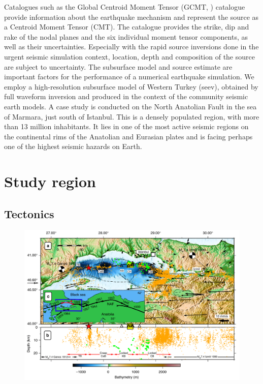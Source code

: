 \documentclass[../Text/00main.tex]{subfiles}
\begin{document}
Catalogues such as the Global Centroid Moment Tensor (GCMT, \cite{ekstromdziewo}) catalogue provide information about the earthquake mechanism and represent the source as a Centroid Moment Tensor (CMT). The catalogue provides the strike, dip and rake of the nodal planes and the six individual moment tensor components, as well as their uncertainties.  Especially with the rapid source inversions done in the urgent seismic simulation context, location, depth and composition of the source are subject to uncertainty. The subsurface model and source estimate are important factors for the performance of a numerical earthquake simulation. We employ a high-resolution subsurface model of Western Turkey (seev\cite{cubuk-sabuncu_3-d_2017}), obtained by full waveform inversion and produced in the context of the community seismic earth models. A case study is conducted on the North Anatolian Fault in the sea of Marmara, just south of Istanbul. This is a densely populated region, with more than 13 million inhabitants. It lies in one of the most active seismic regions on the continental rims of the Anatolian and Eurasian plates and is facing perhaps one of the highest seismic hazards on Earth.


\section{Study region} \label{CH1sec:Tectonics}

\subsection{Tectonics}
 \begin{figure}
     \centering
     \includegraphics[width=.5\linewidth]{images_methods/bonhoff_integrative.png}
     \caption{\cite{bohnhoff_maximum_2016}}
     \label{fig:bonhoffintegrative}
 \end{figure}
\end{document}
